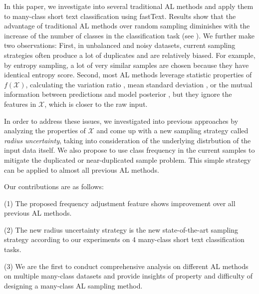 In this paper, we investigate into several traditional AL methods 
and apply them to many-class short text classification using 
fastText. Results show that the advantage of traditional AL methods 
over random sampling diminishes with the increase of the number 
of classes in the classification task (see ).
We further make two observations:
First, in unbalanced and noisy datasets, current sampling strategies often
produce a lot of duplicates and are relatively biased. 
For example, by entropy sampling, 
a lot of very similar samples are chosen because they have identical entropy score. 
Second, most AL methods leverage statistic properties of $f(\mathcal{X})$, 
calculating the variation ratio \cite{freeman1965elementary}, mean standard deviation \cite{kampffmeyer2016semantic}, or the mutual information between predictions and model posterior \cite{houlsby2011bayesian}, but they ignore the features in $\mathcal{X}$, which is closer
to the raw input.

In order to address these issues, we investigated into previous approaches by 
analyzing the properties of $\mathcal{X}$ and come up with a new
sampling strategy called {\em radius uncertainty}, taking into consideration of 
the underlying distrbution of the input data itself. We also propose to use
class frequency in the current samples to mitigate the duplicated or 
near-duplicated sample problem. This simple strategy can be applied to
almost all previous AL methods.

Our contributions are as follows:

(1) The proposed frequency adjustment feature shows improvement over all previous AL methods.
 
(2) The new radius uncertainty strategy is the new state-of-the-art sampling strategy
according to our experiments on 4 many-class short text classification tasks.
 
(3) We are the first to conduct comprehensive analysis on different AL methods on 
multiple many-class datasets and provide insights of property and difficulty of 
designing a many-class AL sampling method. 
